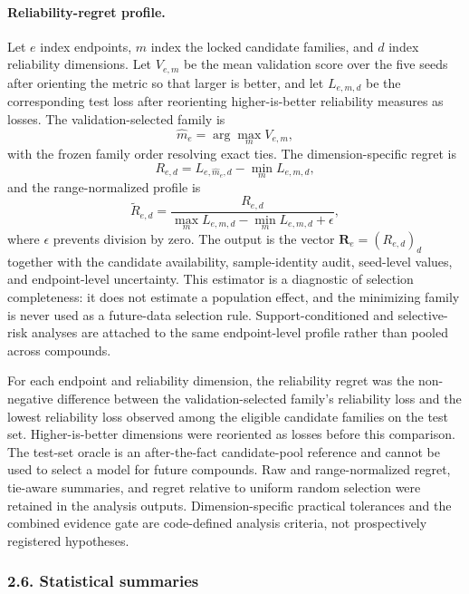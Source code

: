\documentclass[
]{article}
\begin{document}
\paragraph{Reliability-regret profile.}
Let $e$ index endpoints, $m$ index the locked candidate families, and
$d$ index reliability dimensions. Let $V_{e,m}$ be the mean validation
score over the five seeds after orienting the metric so that larger is
better, and let $L_{e,m,d}$ be the corresponding test loss after
reorienting higher-is-better reliability measures as losses. The
validation-selected family is
\[
\hat m_e = \arg\max_m V_{e,m},
\]
with the frozen family order resolving exact ties. The dimension-specific
regret is
\[
R_{e,d}=L_{e,\hat m_e,d}-\min_m L_{e,m,d},
\]
and the range-normalized profile is
\[
\widetilde R_{e,d}=\frac{R_{e,d}}
{\max_m L_{e,m,d}-\min_m L_{e,m,d}+\epsilon},
\]
where $\epsilon$ prevents division by zero. The output is the vector
$\mathbf R_e=(R_{e,d})_d$ together with the candidate availability,
sample-identity audit, seed-level values, and endpoint-level uncertainty.
This estimator is a diagnostic of selection completeness: it does not
estimate a population effect, and the minimizing family is never used as a
future-data selection rule. Support-conditioned and selective-risk
analyses are attached to the same endpoint-level profile rather than
pooled across compounds.

For each endpoint and reliability dimension, the reliability regret was
the non-negative difference between the validation-selected family's
reliability loss and the lowest reliability loss observed among the
eligible candidate families on the test set. Higher-is-better dimensions
were reoriented as losses before this comparison. The test-set oracle is
an after-the-fact candidate-pool reference and cannot be used to select
a model for future compounds. Raw and range-normalized regret, tie-aware
summaries, and regret relative to uniform random selection were retained
in the analysis outputs. Dimension-specific practical tolerances and the
combined evidence gate are code-defined analysis criteria, not
prospectively registered hypotheses.

\subsubsection{2.6. Statistical summaries}\label{statistical-summaries}
\end{document}
